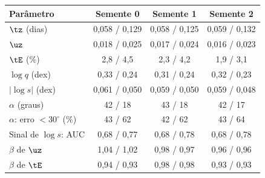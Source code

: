 \begin{tabular}{lccc}
	\toprule
	Parâmetro & Semente 0 & Semente 1 & Semente 2 \\
	\midrule
	$\tz$ (dias) & 0{,}058 / 0{,}129 & 0{,}058 / 0{,}125 & 0{,}059 / 0{,}132 \\
	$\uz$ & 0{,}018 / 0{,}025 & 0{,}017 / 0{,}024 & 0{,}016 / 0{,}023 \\
	$\tE$ (\%) & 2{,}8 / 4{,}5 & 2{,}3 / 4{,}2 & 1{,}9 / 3{,}1 \\
	$\log q$ (dex) & 0{,}33 / 0{,}24 & 0{,}31 / 0{,}24 & 0{,}32 / 0{,}23 \\
	$|\log s|$ (dex) & 0{,}061 / 0{,}050 & 0{,}059 / 0{,}050 & 0{,}059 / 0{,}048 \\
	$\alpha$ (graus) & 42 / 18 & 43 / 18 & 42 / 17 \\
	$\alpha$: erro $< 30^\circ$ (\%) & 43 / 62 & 42 / 62 & 43 / 64 \\
	Sinal de $\log s$: AUC & 0{,}68 / 0{,}77 & 0{,}68 / 0{,}78 & 0{,}68 / 0{,}78 \\
	$\beta$ de $\uz$ & 1{,}04 / 1{,}02 & 0{,}98 / 0{,}97 & 0{,}96 / 0{,}96 \\
	$\beta$ de $\tE$ & 0{,}94 / 0{,}93 & 0{,}98 / 0{,}98 & 0{,}93 / 0{,}93 \\
	\bottomrule
\end{tabular}
